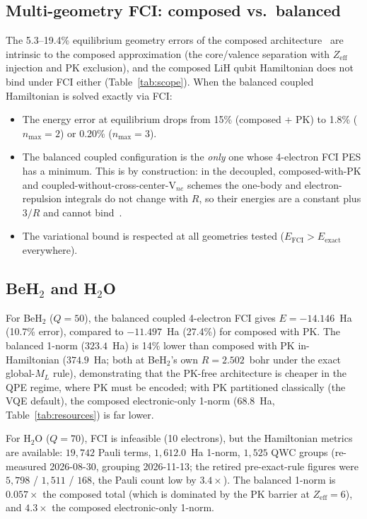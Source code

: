 \documentclass[twocolumn,pra,amsmath,amssymb,superscriptaddress]{revtex4-2}
\begin{document}
\subsection{Multi-geometry FCI: composed vs.\ balanced}

The 5.3--19.4\% equilibrium geometry errors of the composed
architecture~\cite{GeoVac_Paper17} are intrinsic to the composed
approximation (the core/valence separation with $Z_{\mathrm{eff}}$
injection and PK exclusion), and the composed LiH qubit Hamiltonian
does not bind under FCI either (Table~\ref{tab:scope}). When the
balanced coupled Hamiltonian is solved exactly via FCI:

\begin{itemize}
\item The energy error at equilibrium drops from 15\% (composed + PK)
  to 1.8\% ($n_{\max}=2$) or 0.20\% ($n_{\max}=3$).
\item The balanced coupled configuration is the \emph{only} one whose
  4-electron FCI PES has a minimum.  This is by construction: in the
  decoupled, composed-with-PK and coupled-without-cross-center-V$_{ne}$
  schemes the one-body and electron-repulsion integrals do not change
  with $R$, so their energies are a constant plus $3/R$ and cannot
  bind~\cite{GeoVac_Paper19}.
\item The variational bound is respected at all geometries tested
  ($E_{\text{FCI}} > E_{\text{exact}}$ everywhere).
\end{itemize}

\subsection{BeH$_2$ and H$_2$O}

For BeH$_2$ ($Q=50$), the balanced coupled 4-electron FCI gives
$E=-14.146$~Ha (10.7\% error), compared to $-11.497$~Ha (27.4\%)
for composed with PK.  The balanced 1-norm ($323.4$~Ha) is 14\% lower
than composed with PK in-Hamiltonian ($374.9$~Ha; both at BeH$_2$'s own
$R = 2.502$~bohr under the exact global-$M_L$ rule),
demonstrating that the PK-free architecture is cheaper in the QPE
regime, where PK must be encoded; with PK partitioned classically (the
VQE default), the composed electronic-only 1-norm ($68.8$~Ha,
Table~\ref{tab:resources}) is far lower.

For H$_2$O ($Q=70$), FCI is infeasible (10 electrons), but the
Hamiltonian metrics are available: $19{,}742$ Pauli terms,
$1{,}612.0$~Ha 1-norm, $1{,}525$ QWC groups (re-measured 2026-08-30, grouping 2026-11-13; the
retired pre-exact-rule figures were $5{,}798$ / $1{,}511$ / $168$, the
Pauli count low by $3.4\times$).  The balanced 1-norm is $0.057\times$ the
composed total (which is dominated by the PK barrier at $Z_{\text{eff}}=6$),
and $4.3\times$ the composed electronic-only 1-norm.
\end{document}
